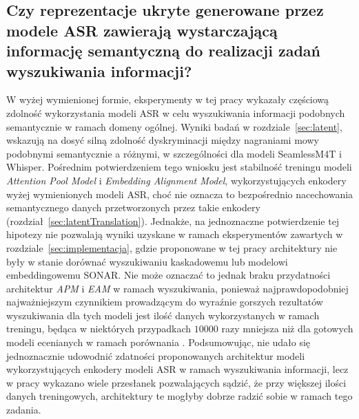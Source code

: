 \subsection{Czy reprezentacje ukryte generowane przez modele ASR zawierają wystarczającą informację semantyczną do realizacji zadań wyszukiwania informacji?}
W wyżej wymienionej formie, eksperymenty w tej pracy wykazały częściową zdolność wykorzystania modeli ASR w celu wyszukiwania informacji podobnych semantycznie w ramach domeny ogólnej. Wyniki badań w rozdziale~\ref{sec:latent}, wskazują na dosyć silną zdolność dyskryminacji między nagraniami mowy podobnymi semantycznie a różnymi, w szczególności dla modeli SeamlessM4T i Whisper. Pośrednim potwierdzeniem tego wniosku jest stabilność treningu modeli \textit{Attention Pool Model} i \textit{Embedding Alignment Model}, wykorzystujących enkodery wyżej wymienionych modeli ASR, choć nie oznacza to bezpośrednio nacechowania semantycznego danych przetworzonych przez takie enkodery (rozdział~\ref{sec:latentTranslation}). Jednakże, na jednoznaczne potwierdzenie tej hipotezy nie pozwalają wyniki uzyskane w ramach eksperymentów zawartych w rozdziale~\ref{sec:implementacja}, gdzie proponowane w tej pracy architektury nie były w stanie dorównać wyszukiwaniu kaskadowemu lub modelowi embeddingowemu SONAR. Nie może oznaczać to jednak braku przydatności architektur \textit{APM} i \textit{EAM} w ramach wyszukiwania, ponieważ najprawdopodobniej najważniejszym czynnikiem prowadzącym do wyraźnie gorszych rezultatów wyszukiwania dla tych modeli jest ilość danych wykorzystanych w ramach treningu, będąca w niektórych przypadkach $10000$ razy mniejsza niż dla gotowych modeli ecenianych w ramach porównania \cite{m4t}. Podsumowując, nie udało się jednoznacznie udowodnić zdatności proponowanych architektur modeli wykorzystujących enkodery modeli ASR w ramach wyszukiwania informacji, lecz w pracy wykazano wiele przesłanek pozwalających sądzić, że przy większej ilości danych treningowych, architektury te mogłyby dobrze radzić sobie w ramach tego zadania.
